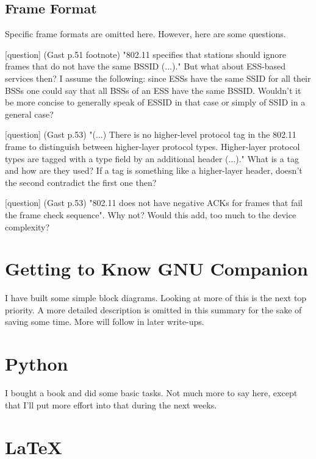 \documentclass{article}
\begin{document}
	\subsection{Frame Format}
	
	Specific frame formats are omitted here. However, here are some questions.
	
	\bigskip
	
	\color{blue}
	[question] (Gast p.51 footnote) "802.11 specifies that stations should ignore frames that do not have the same BSSID (...)." But what about ESS-based services then? I assume the following: since ESSs have the same SSID for all their BSSs one could say that all BSSs of an ESS have the same BSSID. Wouldn't it be more concise to generally speak of ESSID in that case or simply of SSID in a general case?
	\color{black}
	
	\bigskip
	
	\color{blue}
	[question] (Gast p.53) "(...) There is no higher-level protocol tag in the 802.11 frame to distinguish between higher-layer protocol types. Higher-layer protocol types are tagged with a type field by an additional header (...)." What is a tag and how are they used? If a tag is something like a higher-layer header, doesn't the second contradict the first one then?
	\color{black}
	
	\bigskip

	\color{blue}
	[question] (Gast p.53) "802.11 does not have negative ACKs for frames that fail the frame check sequence". Why not? Would this add, too much to the device complexity? 
	\color{black}
	
	\section{Getting to Know GNU Companion}
	
	I have built some simple block diagrams. Looking at more of this is the next top priority. A more detailed description is omitted in this summary for the sake of saving some time. More will follow in later write-ups.

	\section{Python}
	
	I bought a book and did some basic tasks. Not much more to say here, except that I'll put more effort into that during the next weeks. 
	
	\section{\LaTeX}
	
\end{document}
